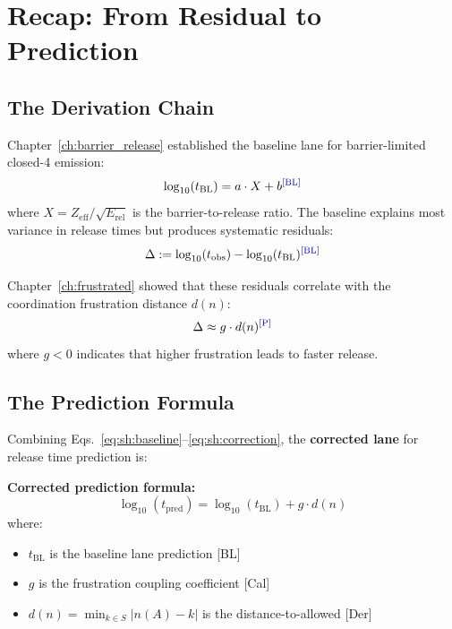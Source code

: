 \section{Recap: From Residual to Prediction}
\label{sec:sh:recap}

\subsection{The Derivation Chain}

Chapter~\ref{ch:barrier_release} established the baseline lane for
barrier-limited closed-4 emission:
\begin{equation}
    \log_{10}(t_{\text{BL}}) = a \cdot X + b \tagBL
    \label{eq:sh:baseline}
\end{equation}
where $X = Z_{\text{eff}}/\sqrt{E_{\text{rel}}}$ is the barrier-to-release
ratio. The baseline explains most variance in release times but produces
systematic residuals:
\begin{equation}
    \Delta := \log_{10}(t_{\text{obs}}) - \log_{10}(t_{\text{BL}}) \tagBL
    \label{eq:sh:residual}
\end{equation}

Chapter~\ref{ch:frustrated} showed that these residuals correlate with
the coordination frustration distance $d(n)$:
\begin{equation}
    \Delta \approx g \cdot d(n) \tagP
    \label{eq:sh:correction}
\end{equation}
where $g < 0$ indicates that higher frustration leads to faster release.

\subsection{The Prediction Formula}

Combining Eqs.~\eqref{eq:sh:baseline}--\eqref{eq:sh:correction}, the
\textbf{corrected lane} for release time prediction is:

\begin{derivationbox}
    \textbf{Corrected prediction formula:}
    \begin{equation}
        \log_{10}(t_{\text{pred}}) = \log_{10}(t_{\text{BL}}) + g \cdot d(n)
        \label{eq:sh:prediction}
    \end{equation}
    where:
    \begin{itemize}
        \item $t_{\text{BL}}$ is the baseline lane prediction [BL]
        \item $g$ is the frustration coupling coefficient [Cal]
        \item $d(n) = \min_{k \in S}|n(A) - k|$ is the distance-to-allowed [Der]
    \end{itemize}
\end{derivationbox}

